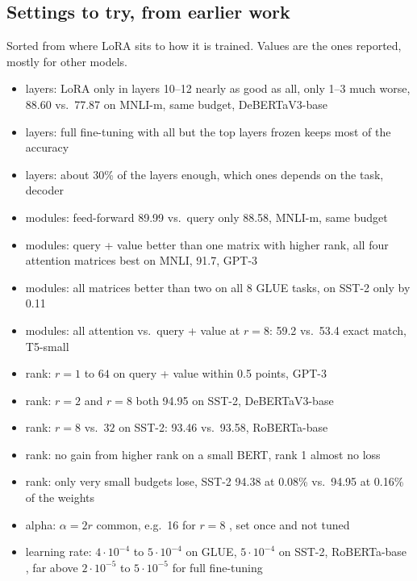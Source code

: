 \documentclass[conference]{IEEEtran}  %
\newcommand{\new}[1]{\textcolor{newgreen}{#1}}  %
\theoremstyle{plain}
\theoremstyle{definition}
\theoremstyle{remark}
\begin{document}
\subsection{\new{Settings to try, from earlier work}}
\new{Sorted from where LoRA sits to how it is trained. Values are the ones reported, mostly for other models.}
\begin{itemize}
  \item \new{layers: LoRA only in layers 10--12 nearly as good as all, only 1--3 much worse, 88.60 vs.\ 77.87 on MNLI-m, same budget, DeBERTaV3-base \cite[Fig.~1b]{zhang2023adalora}}
  \item \new{layers: full fine-tuning with all but the top layers frozen keeps most of the accuracy \cite[Sec.~5.2]{merchant2020happens}}
  \item \new{layers: about 30\% of the layers enough, which ones depends on the task, decoder \cite{zuo2026layer}}
  \item \new{modules: feed-forward 89.99 vs.\ query only 88.58, MNLI-m, same budget \cite[Fig.~1a]{zhang2023adalora}}
  \item \new{modules: query + value better than one matrix with higher rank, all four attention matrices best on MNLI, 91.7, GPT-3 \cite[Tab.~5]{hu2022lora}}
  \item \new{modules: all matrices better than two on all 8 GLUE tasks, on SST-2 only by 0.11 \cite[Tab.~14]{zhang2023adalora}}
  \item \new{modules: all attention vs.\ query + value at $r = 8$: 59.2 vs.\ 53.4 exact match, T5-small \cite{rathor2026howsmall}}
  \item \new{rank: $r = 1$ to $64$ on query + value within 0.5 points, GPT-3 \cite[Tab.~6]{hu2022lora}}
  \item \new{rank: $r = 2$ and $r = 8$ both 94.95 on SST-2, DeBERTaV3-base \cite[Tab.~1]{zhang2023adalora}}
  \item \new{rank: $r = 8$ vs.\ $32$ on SST-2: 93.46 vs.\ 93.58, RoBERTa-base \cite{li2025tokenwise}}
  \item \new{rank: no gain from higher rank on a small BERT, rank 1 almost no loss \cite[Sec.~4.4]{frees2025lora}}
  \item \new{rank: only very small budgets lose, SST-2 94.38 at 0.08\% vs.\ 94.95 at 0.16\% of the weights \cite[Tab.~5]{zhang2023adalora}}
  \item \new{alpha: $\alpha = 2r$ common, e.g.\ 16 for $r = 8$ \cite[Tab.~9]{hu2022lora}, set once and not tuned \cite[Sec.~4.1]{hu2022lora}}
  \item \new{learning rate: $4\cdot10^{-4}$ to $5\cdot10^{-4}$ on GLUE, $5\cdot10^{-4}$ on SST-2, RoBERTa-base \cite[Tab.~9]{hu2022lora}, far above $2\cdot10^{-5}$ to $5\cdot10^{-5}$ for full fine-tuning \cite{devlin2019bert}}

\end{itemize}
\end{document}
